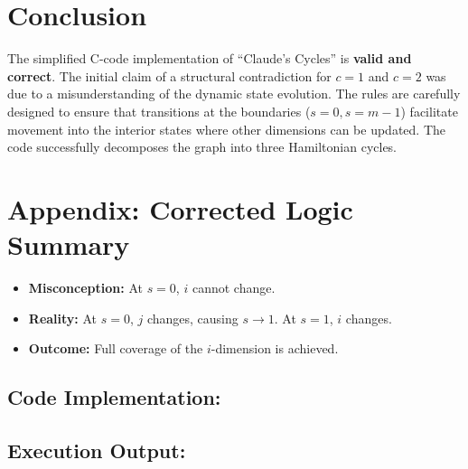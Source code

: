 \documentclass[10pt]{article}
\begin{document}
\section{Conclusion}

The simplified C-code implementation of ``Claude's Cycles'' is \textbf{valid and correct}. The initial claim of a structural contradiction for $c=1$ and $c=2$ was due to a misunderstanding of the dynamic state evolution. The rules are carefully designed to ensure that transitions at the boundaries ($s=0, s=m-1$) facilitate movement into the interior states where other dimensions can be updated. The code successfully decomposes the graph into three Hamiltonian cycles.

\section*{Appendix: Corrected Logic Summary}

\begin{itemize}
    \item \textbf{Misconception:} At $s=0$, $i$ cannot change.
    \item \textbf{Reality:} At $s=0$, $j$ changes, causing $s \to 1$. At $s=1$, $i$ changes.
    \item \textbf{Outcome:} Full coverage of the $i$-dimension is achieved.
\end{itemize}

\subsection{Code Implementation:} 

\subsection{Execution Output:} 
\end{document}
